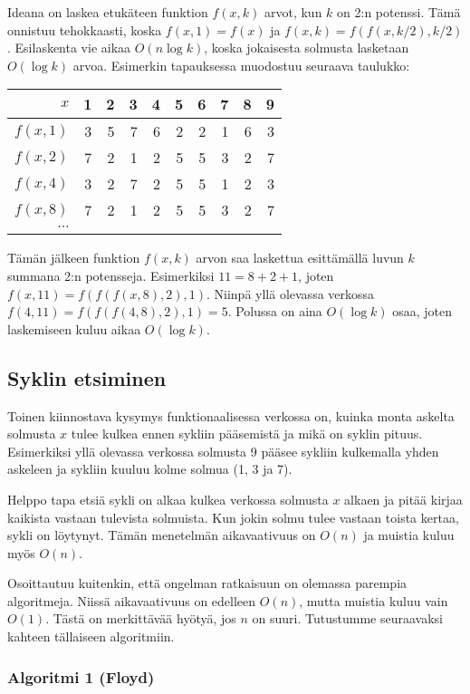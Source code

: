 Ideana on laskea etukäteen funktion $f(x,k)$ arvot, kun $k$ on 2:n potenssi.
Tämä onnistuu tehokkaasti, koska $f(x,1)=f(x)$ ja $f(x,k)=f(f(x,k/2),k/2)$.
Esilaskenta vie aikaa $O(n \log k)$, koska jokaisesta solmusta
lasketaan $O(\log k)$ arvoa.
Esimerkin tapauksessa muodostuu seuraava taulukko:

\begin{center}
\begin{tabular}{r|rrrrrrrrr}
$x$ & 1 & 2 & 3 & 4 & 5 & 6 & 7 & 8 & 9 \\
\hline
$f(x,1)$ & 3 & 5 & 7 & 6 & 2 & 2 & 1 & 6 & 3 \\
$f(x,2)$ & 7 & 2 & 1 & 2 & 5 & 5 & 3 & 2 & 7 \\
$f(x,4)$ & 3 & 2 & 7 & 2 & 5 & 5 & 1 & 2 & 3 \\
$f(x,8)$ & 7 & 2 & 1 & 2 & 5 & 5 & 3 & 2 & 7 \\
$\cdots$ \\
\end{tabular}
\end{center}

Tämän jälkeen funktion $f(x,k)$ arvon saa laskettua
esittämällä luvun $k$ summana 2:n potensseja.
Esimerkiksi $11=8+2+1$, joten $f(x,11)=f(f(f(x,8),2),1)$.
Niinpä yllä olevassa verkossa 
$f(4,11)=f(f(f(4,8),2),1)=5$.
Polussa on aina $O(\log k)$ osaa, joten laskemiseen
kuluu aikaa $O(\log k)$.

\subsection{Syklin etsiminen}

Toinen kiinnostava kysymys funktionaalisessa verkossa on,
kuinka monta askelta solmusta $x$ tulee kulkea
ennen sykliin pääsemistä ja mikä on syklin pituus.
Esimerkiksi yllä olevassa verkossa solmusta 9
pääsee sykliin kulkemalla yhden askeleen
ja sykliin kuuluu kolme solmua (1, 3 ja 7).

Helppo tapa etsiä sykli on alkaa kulkea verkossa
solmusta $x$ alkaen ja pitää kirjaa kaikista vastaan tulevista
solmuista. Kun jokin solmu tulee vastaan toista kertaa,
sykli on löytynyt. Tämän menetelmän aikavaativuus on $O(n)$
ja muistia kuluu myös $O(n)$.

Osoittautuu kuitenkin, että ongelman ratkaisuun on
olemassa parempia algoritmeja.
Niissä aikavaativuus on edelleen $O(n)$,
mutta muistia kuluu vain $O(1)$.
Tästä on merkittävää hyötyä, jos $n$ on suuri.
Tutustumme seuraavaksi kahteen tällaiseen algoritmiin.

\subsubsection{Algoritmi 1 (Floyd)}

